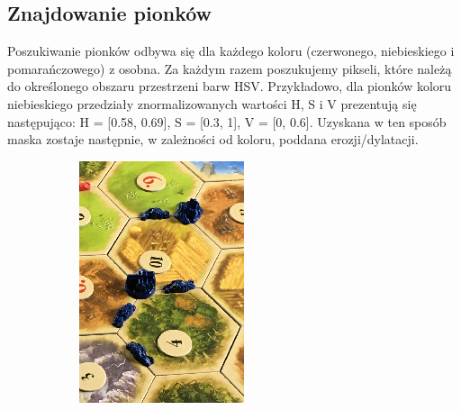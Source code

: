 \documentclass[a4paper]{article}
\begin{document}
    \subsection{Znajdowanie pionków}
       Poszukiwanie pionków odbywa się dla każdego koloru (czerwonego, niebieskiego i pomarańczowego) z osobna.
    Za każdym razem poszukujemy pikseli, które należą do określonego obszaru przestrzeni barw HSV.
    Przykładowo, dla pionków koloru niebieskiego przedziały znormalizowanych wartości H, S i V prezentują się następująco:
    H = [0.58, 0.69], S = [0.3, 1], V = [0, 0.6].
    Uzyskana w ten sposób maska zostaje następnie, w zależności od koloru, poddana erozji/dylatacji.
     \begin{figure}[H]
        \begin{subfigure}[t]{0.3\linewidth}
            \includegraphics[width=\linewidth]{pictures/steps/pawns_fragment.png}

\end{subfigure}
\end{figure}
\end{document}
